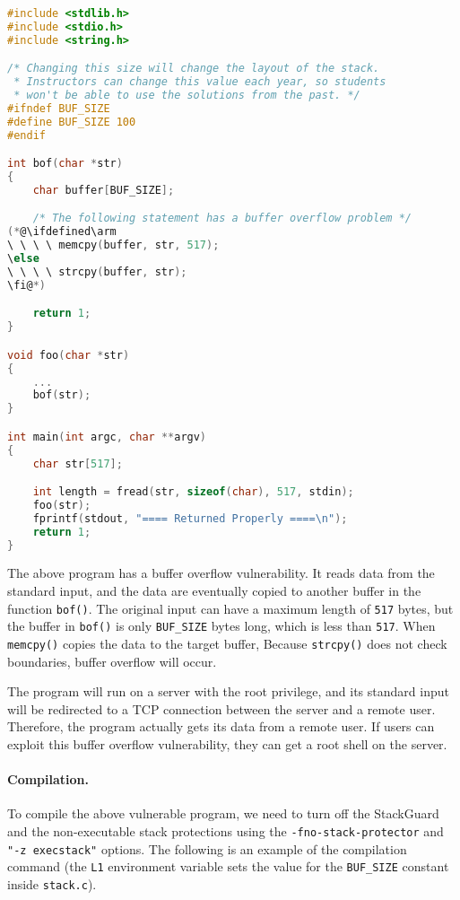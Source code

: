 \begin{lstlisting}[language=C, caption={The vulnerable program \texttt{stack.c}}]
#include <stdlib.h>
#include <stdio.h>
#include <string.h>

/* Changing this size will change the layout of the stack.
 * Instructors can change this value each year, so students
 * won't be able to use the solutions from the past. */
#ifndef BUF_SIZE
#define BUF_SIZE 100
#endif

int bof(char *str)
{
    char buffer[BUF_SIZE];

    /* The following statement has a buffer overflow problem */ 
(*@\ifdefined\arm
\ \ \ \ memcpy(buffer, str, 517);       
\else
\ \ \ \ strcpy(buffer, str);          
\fi@*)

    return 1;
}

void foo(char *str)
{
    ...
    bof(str);
}

int main(int argc, char **argv)
{
    char str[517];

    int length = fread(str, sizeof(char), 517, stdin);
    foo(str);
    fprintf(stdout, "==== Returned Properly ====\n");
    return 1;
}
\end{lstlisting}

The above program has a buffer overflow vulnerability. It 
reads data from the standard input, and the data are 
eventually copied to another buffer in the function {\tt bof()}. 
The original input can have a maximum length of \texttt{517} bytes, but the buffer
in {\tt bof()} is only \texttt{BUF\_SIZE} bytes long, which is less than
\texttt{517}. 
\ifdefined\arm
When \texttt{memcpy()} copies the data to the target buffer,
\else
Because {\tt strcpy()} does not check boundaries, 
\fi
buffer overflow will occur.

The program will run on a server with the root privilege, and its 
standard input will be redirected to a TCP connection between the
server and a remote user. 
Therefore, the program actually gets its data from a remote user. 
If users can exploit this buffer overflow vulnerability, 
they can get a root shell on the server. 


\paragraph{Compilation.}
To compile the above vulnerable program, we need to 
turn off the StackGuard and the non-executable stack protections 
using the \texttt{-fno-stack-protector} and \texttt{"-z execstack"} options.
The following is an example of the compilation command (the \texttt{L1} environment 
variable sets the value for the \texttt{BUF\_SIZE} constant inside \texttt{stack.c}).   

